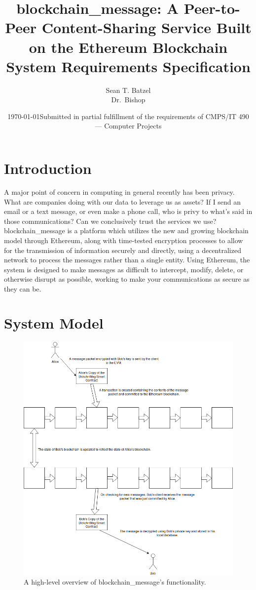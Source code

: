 \documentclass[titlepage]{report}
\title{blockchain\_message: A Peer-to-Peer Content-Sharing Service Built on the Ethereum Blockchain\\\large System Requirements Specification}
\author{Sean T. Batzel\\Dr.\ Bishop}
\date{\today\endgraf\bigskip Submitted in partial fulfillment of the requirements of CMPS/IT 490 --- Computer Projects}
\begin{document}
\maketitle

\tableofcontents

\nocite{*}

\section{Introduction}
A major point of concern in computing in general recently has been privacy. What are companies doing with our data to leverage us as assets? If I send an email or a text message, or even make a phone call, who is privy to what's said in those communications? Can we conclusively trust the services we use? blockchain\_message is a platform which utilizes the new and growing blockchain model through Ethereum, along with time-tested encryption processes to allow for the transmission of information securely and directly, using a decentralized network to process the messages rather than a single entity. Using Ethereum, the system is designed to make messages as difficult to intercept, modify, delete, or otherwise disrupt as possible, working to make your communications as secure as they can be.

\pagebreak
\section{System Model}
\begin{figure}[H]
\centering
\includegraphics[width=1.3\textwidth]{diagram}
\caption{A high-level overview of blockchain\_message's functionality.}
\end{figure}
\pagebreak
\end{document}
